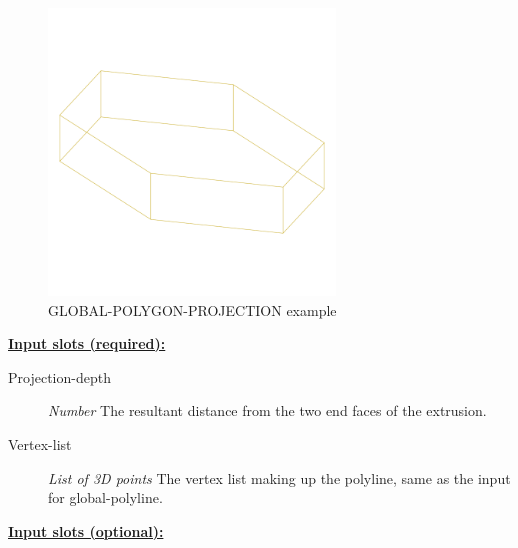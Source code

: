 \documentclass [11pt]{book}
\begin{document}
\begin{itemize}
\begin{figure}
\label{fig:example-code-GLOBAL-POLYGON-PROJECTION}

\end{figure}

\begin{figure}
\begin{center}
\includegraphics[width=3in,height=3in]{../images/example-GLOBAL-POLYGON-PROJECTION.pdf}
\end{center}

\caption{GLOBAL-POLYGON-PROJECTION example}

\label{fig:GLOBAL-POLYGON-PROJECTION}

\end{figure}





\textbf{
\underline{Input slots (required):}}

\begin{description}

\item [Projection-depth]
\emph{Number} The resultant distance from the two end faces of the extrusion.


\item [Vertex-list]
\emph{List of 3D points} The vertex list making up the polyline, same as the input for global-polyline.


\end{description}






\textbf{
\underline{Input slots (optional):}}

\begin{description}


\end{description}
\end{itemize}
\end{document}
